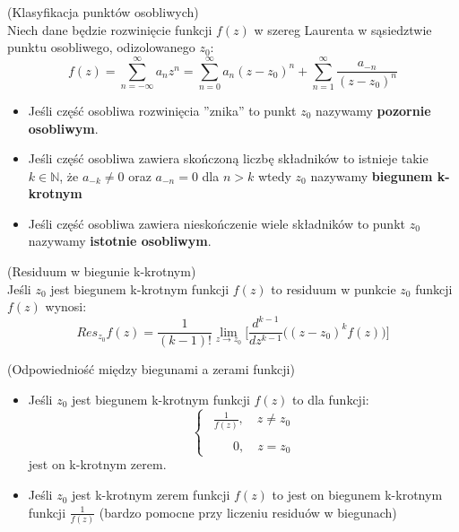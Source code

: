 \begin{df}{(Klasyfikacja punktów osobliwych)}\\
Niech dane będzie rozwinięcie funkcji $f(z)$ w szereg Laurenta w sąsiedztwie punktu osobliwego, odizolowanego $z_0$: $$f(z)=\sum_{n=-\infty}^{\infty} a_n z^n=\sum_{n=0}^{\infty} a_n (z-z_0)^n+\sum_{n=1}^{\infty} \frac{a_{-n}}{(z-z_0)^n}$$ 
\begin{itemize}
  \item
    Jeśli część osobliwa rozwinięcia ''znika'' to punkt $z_0$ nazywamy \textbf{pozornie osobliwym}.
  \item
    Jeśli część osobliwa zawiera skończoną liczbę składników to istnieje takie $k\in \mathbb{N}$, że $a_{-k}\neq 0$ oraz $a_{-n}=0$ dla $n>k$ wtedy $z_0$ nazywamy \textbf{biegunem k-krotnym}
  \item
    Jeśli część osobliwa zawiera nieskończenie wiele składników to punkt $z_0$ nazywamy \textbf{istotnie osobliwym}.
\end{itemize}
\end{df}

\begin{tw}{(Residuum w biegunie k-krotnym)}\\
Jeśli $z_0$ jest biegunem k-krotnym funkcji $f(z)$ to residuum w punkcie $z_0$ funkcji $f(z)$ wynosi: $$Res_{z_0}f(z)=\frac{1}{(k-1)!}\lim_{z \to z_0}\bigg[\frac{d^{k-1}}{dz^{k-1}}\bigg((z-z_0)^k f(z)\bigg)\bigg]$$
\end{tw}

\begin{tw}{(Odpowiedniość między biegunami a zerami funkcji)}\\
\begin{itemize}
  \item
    Jeśli $z_0$ jest biegunem k-krotnym funkcji $f(z)$ to dla funkcji:
	\begin{displaymath}
	\left\{\begin{array}{ll}
	\ \ \displaystyle{\frac{1}{f(z)},\quad z\neq z_0}
	\\
	\\\displaystyle{\qquad 0,\quad z=z_0}
	\end{array} \right.
	\end{displaymath}
	jest on k-krotnym zerem.
  \item
    Jeśli $z_0$ jest k-krotnym zerem funkcji $f(z)$ to jest on biegunem k-krotnym funkcji $\frac{1}{f(z)}$ (bardzo pomocne przy liczeniu residuów w biegunach)
\end{itemize}
\end{tw}

